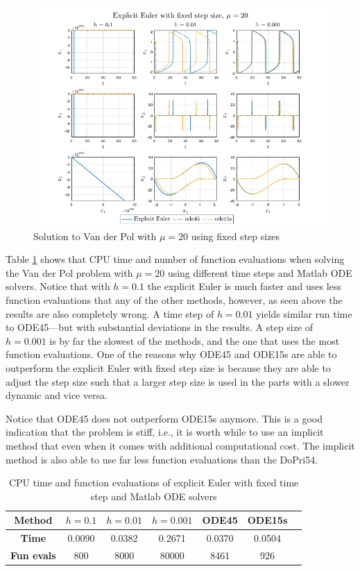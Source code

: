 \begin{figure}[H]
    \centering
    \includegraphics[width=\textwidth]{graphics/opg2/fixed_mu20.png}
    \caption{Solution to Van der Pol with $\mu = 20$ using fixed step sizes}
    \label{fig2:fixed_mu20}
\end{figure}

Table \ref{tab2:mu20_fixed} shows that CPU time and number of function evaluations when solving the Van der Pol problem with $\mu = 20$ using different time steps and Matlab ODE solvers. Notice that with $h=0.1$ the explicit Euler is much faster and uses less function evaluations that any of the other methods, however, as seen above the results are also completely wrong. A time step of $h=0.01$ yields similar run time to ODE45---but with substantial deviations in the results. A step size of $h=0.001$ is by far the slowest of the methods, and the one that uses the most function evaluations. One of the reasons why ODE45 and ODE15s are able to outperform the explicit Euler with fixed step size is because they are able to adjust the step size such that a larger step size is used in the parts with a slower dynamic and vice versa. 

Notice that ODE45 does not outperform ODE15s anymore. This is a good indication that the problem is stiff, i.e., it is worth while to use an implicit method that even when it comes with additional computational cost. The implicit method is also able to use far less function evaluations than the DoPri54. 

\begin{table}[H]
    \centering
    \caption{CPU time and function evaluations of explicit Euler with fixed time step and Matlab ODE solvers}
    \begin{tabular}{|c||c|c|c|c|c|c|} \hline
         \textbf{Method}    & $h=0.1$&   $h=0.01$ & $h=0.001$ & ODE45 & ODE15s     \\ \hline \hline 
         \textbf{Time}      & 0.0090  &  0.0382   &  0.2671 & 0.0370 & 0.0504   \\ \hline
         \textbf{Fun evals} & 800    &    8000    &   80000 & 8461 & 926  \\ \hline
    \end{tabular}
    \label{tab2:mu20_fixed}
\end{table}



